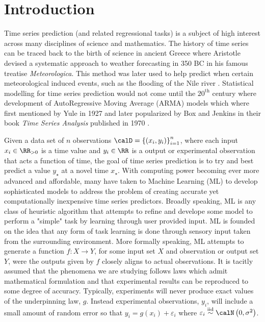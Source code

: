 \section*{Introduction}


Time series prediction (and related regressional tasks) is a subject of high interest across many disciplines of science and mathematics. The history of time series can be traced back to the birth of science in ancient Greece where Aristotle devised a systematic approach to weather forecasting in 350 BC in his famous treatise {\it Meteorologica}. This method was later used to help predict when certain meteorological induced events, such as the flooding of the Nile river \cite{10.2307/26254645}. Statistical modelling for time series prediction would not come until the $20^{\text{th}}$ century where development of AutoRegressive Moving Average (ARMA) models which where first mentioned by Yule \cite{YuleG.Udny1927OaMo} in 1927 and later popularized by Box and Jenkins in their book {\it Time Series Analysis} published in 1970 \cite{BoxGeorgeE.P.2008Tsa:}.

Given a data set of $n$ observations $\calD = \left\{ \left( x_i , y_i \right) \right\}_{i=1}^{n}$, where each input $x_i \in \RR_{>0}$ is a time value and $y_i \in \RR$ is a output or experimental observation that acts a function of time, the goal of time series prediction is to try and best predict a value $y_{\star}$ at a novel time $x_{\star}$. With computing power becoming ever more advanced and affordable, many have taken to Machine Learning (ML) to develop sophisticated models to address the problem of creating accurate yet computationally inexpensive time series predictors. Broadly speaking, ML is any class of heuristic algorithm that attempts to refine and develope some model to perform a "simple" task by learning through user provided input. ML is founded on the idea that any form of task learning is done through sensory input taken from the surrounding environment. More formally speaking, ML attempts to generate a function $f : X \to Y$, for some input set $X$ and observation or output set $Y$, were the outputs given by $f$ closely aligns to actual observations. It is tacitly assumed  that the phenomena we are studying follows laws which admit mathematical formulation and that experimental results can be reproduced to some degree of accuracy. Typically, experiments will never produce exact values of the underpinning law, $g$. Instead experimental observations, $y_i$, will include a small amount of random error so that $y_i =  g(x_i) + \varepsilon_i$ where $\varepsilon_i \overset{\text{iid}}{\sim} \calN \left( 0, \sigma^2 \right)$.

